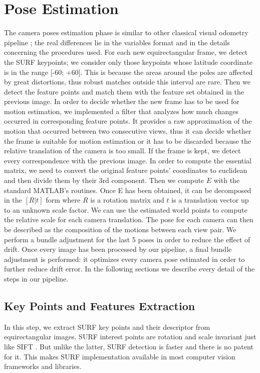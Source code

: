 \section{Pose Estimation}
\label{sec:pipeline_pose_estimation}
The camera poses estimation phase is similar to other classical visual 
odometry pipeline \cite{scaramuzzaVisualOdometryI,moravec1980obstacle};
the real differences lie in the variables format and in 
the details concerning the procedures used. For each new equirectangular frame, we detect the
SURF keypoints; we consider only those keypoints whose latitude coordinate is in
the range [-60\degree; +60\degree]. This is because the areas around the poles 
are affected by great distortions, thus robust matches outside this interval are
rare.
Then we detect the feature points and match them with the feature set 
obtained in the previous image.
%
In order to decide whether the new frame has to be used for motion estimation, 
we implemented a filter that analyzes how much changes occurred in 
corresponding feature points. It provides a raw approximation of the 
motion that occurred between two consecutive views, thus it can decide whether 
the frame is suitable for motion estimation or it has to be discarded because 
the relative translation of the camera is too small.
%
If the frame is kept, we detect every correspondence with the previous image.
In order to compute the essential matrix, we need to convert the original 
feature points' coordinates to euclidean and then divide them by their 3rd 
component. Then we compute $E$ with the standard MATLAB's routines.
Once E has been obtained, it can be decomposed in the \([R|t]\)
form where $R$ is a rotation matrix and $t$ is a translation vector up to 
an unknown scale factor.
We can use the estimated world points to compute the relative scale for each
camera translation.
The pose for each camera can then be described as the composition of the 
motions between each view pair. We perform a bundle adjustment for the last 5 
poses in order to reduce the effect of drift.
Once every image has been processed by our pipeline, a final 
bundle adjustment is performed: it optimizes every camera pose estimated in order to 
further reduce drift error.
In the following sections we describe every detail of the steps in our pipeline.

\subsection{Key Points and Features Extraction}
In this step, we extract SURF key points and their descriptor 
\cite{funayama2012robust} from equirectangular images. SURF 
interest points are rotation and scale invariant just like SIFT
\cite{lowe1999object}. But unlike 
the latter, SURF detection is faster and there is no patent for it. 
This makes SURF implementation available in most computer vision frameworks and 
libraries.

